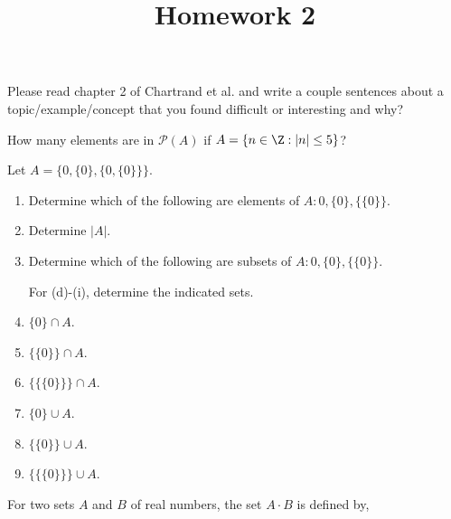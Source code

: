 \documentclass{homework}
\title{Homework 2}
\begin{document}
 \maketitle

\question Please read chapter 2 of Chartrand et al. and write a couple sentences about a topic/example/concept that you found difficult or interesting and why?

\question How many elements are in $\mathcal{P}(A)$ if $A = \{n \in \Z: |n| \leq 5\}$?


\question Let $A = \{0, \{0\}, \{0, \{0\}\}\}$.
\begin{enumerate}[label=(\alph*)]
    \item Determine which of the following are elements of $A: 0, \{0\}, \{\{0\}\}$.


    \item Determine $|A|$.

    
    \item Determine which of the following are subsets of $A: 0, \{0\}, \{\{0\}\}$.

    
    For (d)-(i), determine the indicated sets.
    \item $\{0\} \cap A$.

    
    \item $\{\{0\}\} \cap A$.

    
    \item $\{\{\{0\}\}\} \cap A$.

    
    \item $\{0\} \cup A$.

    
    \item $\{\{0\}\} \cup A$.

    
    \item $\{\{\{0\}\}\} \cup A$.

\end{enumerate}
\question For two sets $A$ and $B$ of real numbers, the set $A \cdot B$ is deﬁned by,
\end{document}

